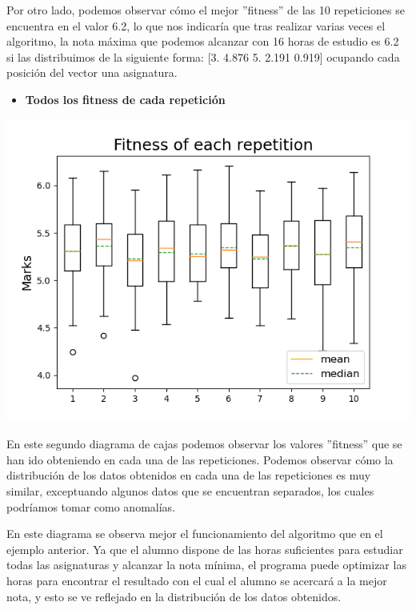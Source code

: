 \documentclass[11pt, a4paper, titlepage]{article}
\begin{document}
\vspace{5mm}

Por otro lado, podemos observar cómo el mejor ''fitness'' de las 10 repeticiones se encuentra en el valor 6.2, lo que nos indicaría que tras realizar varias veces el algoritmo, la nota máxima que podemos alcanzar con 16 horas de estudio es 6.2 si las distribuimos de la siguiente forma: [3.    4.876 5.    2.191 0.919] ocupando cada posición del vector una asignatura.

\vspace{5mm}

\begin{itemize}
\item \textbf{Todos los fitness de cada repetición}
\end{itemize}

\includegraphics[scale=0.6]{img/grafica2_horsuf}

\vspace{5mm}

En este segundo diagrama de cajas podemos observar los valores ''fitness'' que se han ido obteniendo en cada una de las repeticiones. Podemos observar cómo la distribución de los datos obtenidos en cada una de las repeticiones es muy similar, exceptuando algunos datos que se encuentran separados, los cuales podríamos tomar como anomalías.

\vspace{5mm}

En este diagrama se observa mejor el funcionamiento del algoritmo que en el ejemplo anterior. Ya que el alumno dispone de las horas suficientes para estudiar todas las asignaturas y alcanzar la nota mínima, el programa puede optimizar las horas para encontrar el resultado con el cual el alumno se acercará a la mejor nota, y esto se ve reflejado en la distribución de los datos obtenidos.
\end{document}
